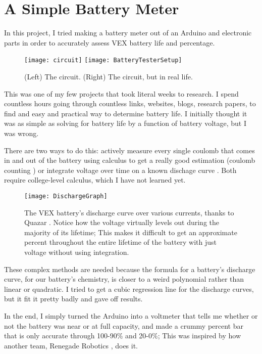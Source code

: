 \section{A Simple Battery Meter}
In this project, I tried making a battery meter out of an Arduino and electronic parts in order to accurately assess VEX battery life and percentage.

\begin{figure}[h]
    \centering
    \texttt{[image: circuit]}
    \texttt{[image: BatteryTesterSetup]}
    \caption{
        (Left) The circuit. (Right) The circuit, but in real life.
    }
\end{figure}

This was one of my few projects that took literal weeks to research. I spend countless hours going through countless links, websites, blogs, research papers, to find and easy and practical way to determine battery life. I initially thought it was as simple as solving for battery life by a function of battery voltage, but I was wrong.

There are two ways to do this: actively measure every single coulomb that comes in and out of the battery using calculus to get a really good estimation (coulomb counting \cite{CoulombCounting}) or integrate voltage over time on a known dischage curve \cite{IntegrationVoltage}. Both require college-level calculus, which I have not learned yet.

\begin{figure}[h]
    \centering
    \texttt{[image: DischargeGraph]}
    \caption{
        The VEX battery's discharge curve over various currents, thanks to Quazar \cite{Quazar}. Notice how the voltage virtually levels out during the majority of its lifetime; This makes it difficult to get an approximate percent throughout the entire lifetime of the battery with just voltage without using integration.
    }
\end{figure}

These complex methods are needed because the formula for a battery's discharge curve, for our battery's chemistry, is closer to a weird polynomial rather than linear or quadratic. I tried to get a cubic regression line for the discharge curves, but it fit it pretty badly and gave off results.

In the end, I simply turned the Arduino into a voltmeter that tells me whether or not the battery was near or at full capacity, and made a crummy percent bar that is only accurate through 100-90\% and 20-0\%; This was inspired by how another team, Renegade Robotics \cite{RenegadeRobotics}, does it.
